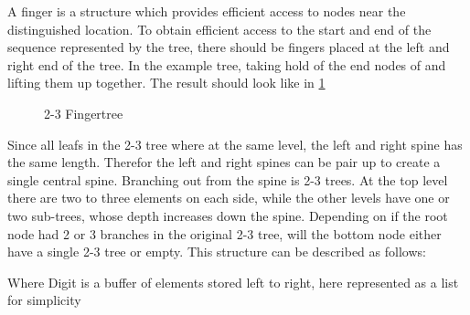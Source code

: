 A finger is a structure which provides efficient access to nodes near the
distinguished location. To obtain efficient access to the start and end of the
sequence represented by the tree, there should be fingers placed at the left and
right end of the tree. In the example tree, taking hold of the end nodes of and
lifting them up together. The result should look like in \cref{fig:fingertree}
\begin{figure}[!h]
  \centering
  \caption{2-3 Fingertree
  \label{fig:fingertree}}
\end{figure}

Since all leafs in the 2-3 tree where at the same level, the left and right
spine has the same length. Therefor the left and right spines can be pair up to
create a single central spine. Branching out from the spine is 2-3 trees. At the
top level there are two to three elements on each side, while the other levels
have one or two sub-trees, whose depth increases down the spine. Depending on if
the root node had 2 or 3 branches in the original 2-3 tree, will the bottom node
either have a single 2-3 tree or empty. This structure can be described as
follows:

Where Digit is a buffer of elements stored left to right, here represented as a
list for simplicity

